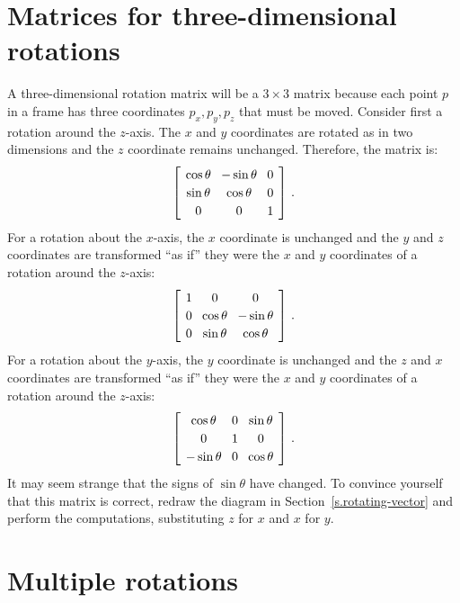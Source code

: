 \documentclass[11pt,a4paper]{report}
\newcommand*{\spacearray}{
\renewcommand{\arraystretch}{1.2}
\setlength{\arraycolsep}{4pt}
}
\begin{document}
\section{Matrices for three-dimensional rotations}

A three-dimensional rotation matrix will be a $3\times 3$ matrix because each point $p$ in a frame has three coordinates $p_x,p_y,p_z$ that must be moved. Consider first a rotation around the $z$-axis. The $x$ and $y$ coordinates are rotated as in two dimensions and the $z$ coordinate remains unchanged. Therefore, the matrix is:
\[
\spacearray
\left[\begin{array}{ccc}\cos\theta&-\sin\theta&0\\\sin\theta&\cos\theta&0\\0&0&1\end{array}\right]\,.
\]
For a rotation about the $x$-axis, the $x$ coordinate is unchanged and the $y$ and $z$ coordinates are transformed ``as if'' they were the $x$ and $y$ coordinates of a rotation around the $z$-axis:
\[
\spacearray
\left[\begin{array}{ccc}1&0&0\\0&\cos\theta&-\sin\theta\\0&\sin\theta&\cos\theta\\\end{array}\right]\,.
\]
For a rotation about the $y$-axis, the $y$ coordinate is unchanged and the $z$ and $x$ coordinates are transformed ``as if'' they were the $x$ and $y$ coordinates of a rotation around the $z$-axis:
\[
\spacearray
\left[\begin{array}{ccc}\cos\theta&0&\sin\theta\\0&1&0\\-\sin\theta&0&\cos\theta\\\end{array}\right]\,.
\]
It may seem strange that the signs of $\sin\theta$ have changed. To convince yourself that this matrix is correct, redraw the diagram in Section~\ref{s.rotating-vector} and perform the computations, substituting $z$ for $x$ and $x$ for $y$.

\section{Multiple rotations}\label{s.multiple-rotations}
\end{document}
